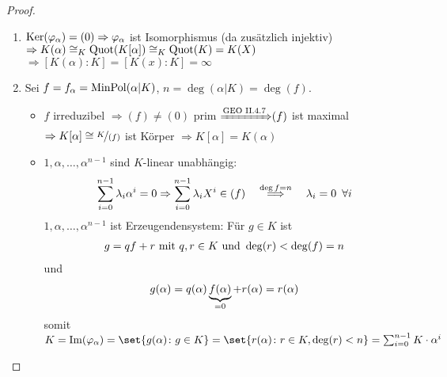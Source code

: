 \begin{proof}
	\begin{enumerate}[label=(\alph*)]
		\item $\operatorname{Ker}(\varphi_\alpha) = (0) \Rightarrow \varphi_\alpha$ ist Isomorphismus (da zusätzlich injektiv) \\
		$\Rightarrow K(\alpha) \cong_K \operatorname{Quot}(K[\alpha]) \cong_K \operatorname{Quot}(K) = K(X)$ \\
		$\Rightarrow [K(\alpha) \colon K] = [K(x) \colon K] = \infty$
		\item Sei $f = f_\alpha = \operatorname{MinPol}(\alpha \vert K)$, $n = \deg(\alpha \vert K) = \deg(f)$.
		\begin{itemize}
			\item $f$ irreduzibel $\Rightarrow (f) \neq (0)$ prim ${\xRightarrow{\text{GEO II.4.7}}} (f)$ ist maximal \\
			$\Rightarrow K[\alpha] \cong \lnkset{K}{(f)}$ ist Körper $\Rightarrow K[\alpha] = K(\alpha)$
			\item $1, \alpha, \dots , \alpha^{n-1}$ sind $K$-linear unabhängig: 
			\begin{align}
			\sum_{i=0}^{n-1} \lambda_i \alpha^i = 0 \Rightarrow \sum_{i=0}^{n-1} \lambda_i X^i \in (f) \quad \overset{\deg f = n}{\Longrightarrow} \quad \lambda_i = 0 \enskip \forall i \notag
			\end{align}
			$1, \alpha, \dots , \alpha^{n-1}$ ist Erzeugendensystem: Für $g \in K$ ist 
			\begin{align}
			g = qf + r \text{ mit } q,r \in K \text{ und } \deg(r) < \deg(f) = n \notag
			\end{align}
			und  
			\begin{align}
			g(\alpha) = q(\alpha) \underbrace{f(\alpha)}_{=0} + r(\alpha) = r(\alpha) \notag
			\end{align}
			somit $K = \Image(\phi_\alpha) = \set{g(\alpha) \colon g \in K} = \set{r(\alpha) \colon r \in K, \deg(r) < n} = \sum_{i=0}^{n-1} K \cdot \alpha^i$
		\end{itemize}
	\end{enumerate}
\end{proof}

